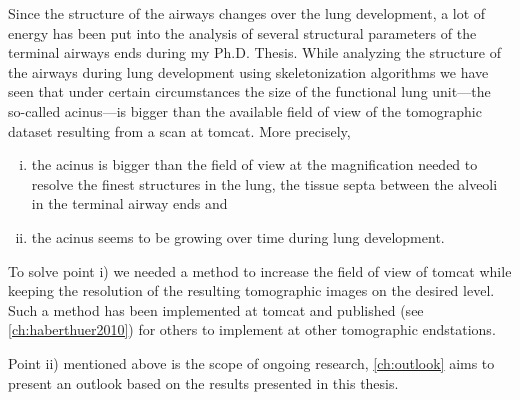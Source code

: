 Since the structure of the airways changes over the lung development\cite{Burri1974}, a lot of energy has been put into the analysis of several structural parameters of the terminal airways ends during my Ph.D. Thesis. While analyzing the structure of the airways during lung development using skeletonization algorithms we have seen that under certain circumstances the size of the functional lung unit---the so-called acinus---is bigger than the available field of view of the tomographic dataset resulting from a scan at \ac{tomcat}. More precisely, 
\begin{enumerate}[i)]
	\item the acinus is bigger than the field of view at the magnification needed to resolve the finest structures in the lung, the tissue septa between the alveoli in the terminal airway ends and
	\item the acinus seems to be growing over time during lung development.
\end{enumerate}

To solve point i) we needed a method to increase the field of view of \ac{tomcat} while keeping the resolution of the resulting tomographic images on the desired level. Such a method has been implemented at \ac{tomcat} and published (see \autoref{ch:haberthuer2010}) for others to implement at other tomographic endstations.

Point ii) mentioned above is the scope of ongoing research, \autoref{ch:outlook} aims to present an outlook based on the results presented in this thesis. 

